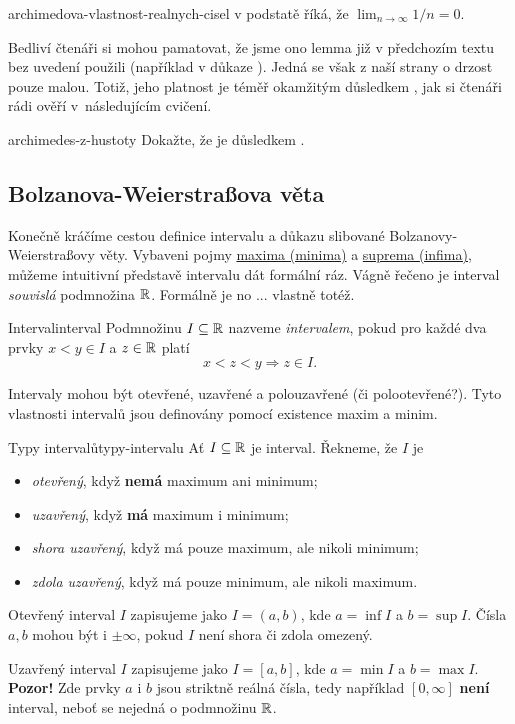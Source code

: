 \begin{remark}{}{archimedova-vlastnost-realnych-cisel}
  v podstatě říká, že
 $\lim_{n \to \infty} 1 / n = 0$.

 Bedliví čtenáři si mohou pamatovat, že jsme ono lemma již v předchozím textu
 bez uvedení použili (například v důkaze ).
 Jedná se však z naší strany o drzost pouze malou. Totiž, jeho platnost je téměř
 okamžitým důsledkem , jak si čtenáři rádi
 ověří v~následujícím cvičení.
\end{remark}
\begin{exercise}{}{archimedes-z-hustoty}
 Dokažte, že  je
 důsledkem .
\end{exercise}

\subsection{Bolzanova-Weierstraßova věta}
\label{ssec:bolzanova-weierstrassova-veta}

Konečně kráčíme cestou definice intervalu a důkazu slibované
Bolzanovy-Weierstraßovy věty. Vybaveni pojmy
\hyperref[def:maximum-a-minimum]{maxima (minima)} a
\hyperref[def:supremum-a-infimum]{suprema (infima)}, můžeme intuitivní
představě intervalu dát formální ráz. Vágně řečeno je interval \emph{souvislá}
podmnožina $\mathbb{R}$. Formálně je no ... vlastně totéž.

\begin{definition}{Interval}{interval}
 Podmnožinu $I \subseteq \mathbb{R}$ nazveme \emph{intervalem}, pokud pro každé dva
 prvky $x < y \in I$ a $z \in \mathbb{R}$ platí
 \[
  x < z < y \Rightarrow z \in I.
 \]
\end{definition}

Intervaly mohou být otevřené, uzavřené a polouzavřené (či polootevřené?). Tyto
vlastnosti intervalů jsou definovány pomocí existence maxim a minim.

\begin{definition}{Typy intervalů}{typy-intervalu}
 Ať $I \subseteq \mathbb{R}$ je interval. Řekneme, že $I$ je
 \begin{itemize}
  \item \emph{otevřený}, když \textbf{nemá} maximum ani minimum;
  \item \emph{uzavřený}, když \textbf{má} maximum i minimum;
  \item \emph{shora uzavřený}, když má pouze maximum, ale nikoli minimum;
  \item \emph{zdola uzavřený}, když má pouze minimum, ale nikoli maximum.
 \end{itemize}
 Otevřený interval $I$ zapisujeme jako $I = (a,b)$, kde $a = \inf I$ a $b = \sup
 I$. Čísla $a,b$ mohou být i $ \pm \infty$, pokud $I$ není shora či zdola
 omezený.

 Uzavřený interval $I$ zapisujeme jako $I = [a,b]$, kde $a = \min I$ a $b = \max
 I$. \textbf{Pozor!} Zde prvky $a$ i $b$ jsou striktně reálná čísla, tedy
 například $[0,\infty]$ \textbf{není} interval, neboť se nejedná o podmnožinu
 $\mathbb{R}$.
\end{definition}

